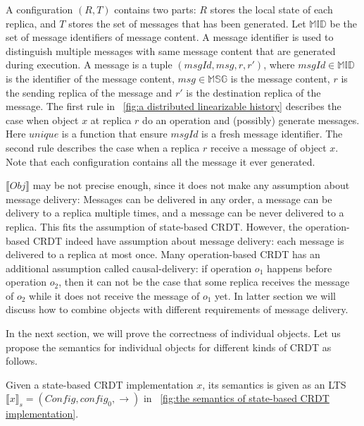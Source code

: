 A configuration $(R,T)$ contains two parts: $R$ stores the local state of each replica, and $T$ stores the set of messages that has been generated. Let $\mathbb{MID}$ be the set of message identifiers of message content. A message identifier is used to distinguish multiple messages with same message content that are generated during execution. A message is a tuple $(\mathit{msgId},\mathit{msg},r,r')$, where $\mathit{msgId} \in \mathbb{MID}$ is the identifier of the message content, $\mathit{msg} \in \mathbb{MSG}$ is the message content, $r$ is the sending replica of the message and $r'$ is the destination replica of the message. The first rule in \figurename~\ref{fig:a distributed linearizable history} describes the case when object $x$ at replica $r$ do an operation and (possibly) generate messages. Here $\mathit{unique}$ is a function that ensure $\mathit{msgId}$ is a fresh message identifier. The second rule describes the case when a replica $r$ receive a message of object $x$. Note that each configuration contains all the message it ever generated.

$\llbracket \mathit{Obj} \rrbracket$ may be not precise enough, since it does not make any assumption about message delivery: Messages can be delivered in any order, a message can be delivery to a replica multiple times, and a message can be never delivered to a replica. This fits the assumption of state-based CRDT. However, the operation-based CRDT indeed have assumption about message delivery: each message is delivered to a replica at most once. Many operation-based CRDT has an additional assumption called causal-delivery: if operation $o_1$ happens before operation $o_2$, then it can not be the case that some replica receives the message of $o_2$ while it does not receive the message of $o_1$ yet. In latter section we will discuss how to combine objects with different requirements of message delivery.

In the next section, we will prove the correctness of individual objects. Let us propose the semantics for individual objects for different kinds of CRDT as follows. 

 Given a state-based CRDT implementation $x$, its semantics is given as an LTS $\llbracket x \rrbracket_{s} = (\mathit{Config},\mathit{config}_0,\rightarrow)$ in \figurename~\ref{fig:the semantics of state-based CRDT implementation}.

